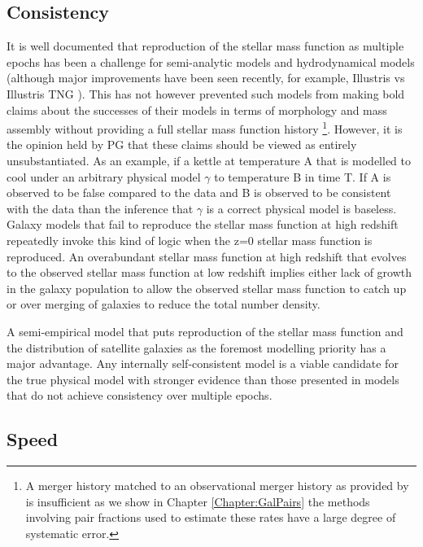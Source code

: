 \subsection{Consistency}
It is well documented that reproduction of the stellar mass function as multiple epochs has been a challenge for semi-analytic models \cite{Knebe2018CosmicModels, Asquith2018CosmicModels} and hydrodynamical models (although major improvements have been seen recently, for example, Illustris vs Illustris TNG \cite{Nelson2015TheRelease, Nelson2018TheRelease}). This has not however prevented such models from making bold claims about the successes of their models in terms of morphology and mass assembly without providing a full stellar mass function history \cite[e.g.][]{Somerville2008ANuclei, Hopkins2010MERGERSMATTER}\footnote{A merger history matched to an observational merger history as provided by \citet{Hopkins2010MERGERSMATTER} is insufficient as we show in Chapter \ref{Chapter:GalPairs} the methods involving pair fractions used to estimate these rates have a large degree of systematic error.}. However, it is the opinion held by PG that these claims should be viewed as entirely unsubstantiated. As an example, if a kettle at temperature A that is modelled to cool under an arbitrary physical model $\gamma$ to temperature B in time T. If A is observed to be false compared to the data and B is observed to be consistent with the data than the inference that $\gamma$ is a correct physical model is baseless. Galaxy models that fail to reproduce the stellar mass function at high redshift repeatedly invoke this kind of logic when the z=0 stellar mass function is reproduced. An overabundant stellar mass function at high redshift that evolves to the observed stellar mass function at low redshift implies either lack of growth in the galaxy population to allow the observed stellar mass function to catch up or over merging of galaxies to reduce the total number density.

A semi-empirical model that puts reproduction of the stellar mass function and the distribution of satellite galaxies as the foremost modelling priority has a major advantage. Any internally self-consistent model is a viable candidate for the true physical model with stronger evidence than those presented in models that do not achieve consistency over multiple epochs. 

\subsection{Speed}

